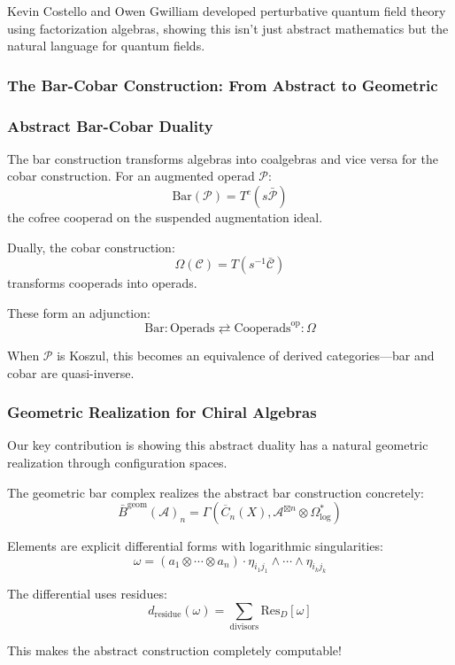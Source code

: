Kevin Costello and Owen Gwilliam \cite{CG17} developed perturbative quantum field theory using factorization algebras, showing this isn't just abstract mathematics but the natural language for quantum fields.

\subsubsection{The Bar-Cobar Construction: From Abstract to Geometric}

\subsubsection{Abstract Bar-Cobar Duality}

The bar construction transforms algebras into coalgebras and vice versa for the cobar construction. For an augmented operad $\mathcal{P}$:
$$\text{Bar}(\mathcal{P}) = T^c(s\bar{\mathcal{P}})$$
the cofree cooperad on the suspended augmentation ideal.

Dually, the cobar construction:
$$\Omega(\mathcal{C}) = T(s^{-1}\bar{\mathcal{C}})$$
transforms cooperads into operads.

These form an adjunction:
$$\text{Bar}: \text{Operads} \rightleftarrows \text{Cooperads}^{\text{op}} : \Omega$$

When $\mathcal{P}$ is Koszul, this becomes an equivalence of derived categories—bar and cobar are quasi-inverse.

\subsubsection{Geometric Realization for Chiral Algebras}

Our key contribution is showing this abstract duality has a natural geometric realization through configuration spaces.

The geometric bar complex realizes the abstract bar construction concretely:
$$\bar{B}^{\text{geom}}(\mathcal{A})_n = \Gamma\left(\overline{C}_n(X), \mathcal{A}^{\boxtimes n} \otimes \Omega^*_{\text{log}}\right)$$

Elements are explicit differential forms with logarithmic singularities:
$$\omega = (a_1 \otimes \cdots \otimes a_n) \cdot \eta_{i_1j_1} \wedge \cdots \wedge \eta_{i_kj_k}$$

The differential uses residues:
$$d_{\text{residue}}(\omega) = \sum_{\text{divisors}} \text{Res}_{D}[\omega]$$

This makes the abstract construction completely computable!


